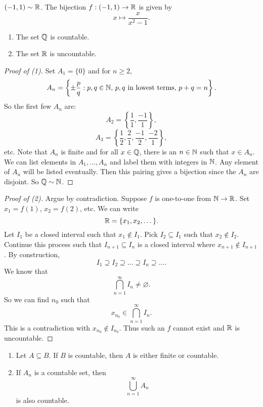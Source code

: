 \begin{example}
  $(-1, 1) \sim \mathbb{R}$.
  The bijection  $f : (-1, 1) \to \mathbb{R}$ is given by
  \[x \mapsto \frac{x}{x^2 - 1}.\]
\end{example}

\begin{theorem}\leavevmode
  \begin{enumerate}
    \item The set $\mathbb{Q}$ is countable.
    \item The set $\mathbb{R}$ is uncountable.
  \end{enumerate}
\end{theorem}

\begin{proof}[Proof of (1)]
  Set $A_1 = \{0\}$ and for $n \ge 2$,
  \[A_n = \left\{\pm \frac{p}{q} : p, q \in \mathbb{N},\, \text{$p, q$ in lowest terms},\, p + q = n\right\}.\]
  So the first few $A_n$ are:
  \[A_2 = \left\{\frac{1}{1}, \frac{-1}{1}\right\},\]
  \[A_3 = \left\{\frac{1}{2}, \frac{2}{1}, \frac{-1}{2}, \frac{-2}{1}\right\},\]
  etc. Note that $A_n$ is finite and
  for all
  $x \in \mathbb{Q}$, there is an $n \in \mathbb{N}$ such that
  $x \in A_n$.
  We can list elements in $A_1, \dots, A_n$ and label
  them with
  integers in $\mathbb{N}$. Any element of $A_n$ will be
  listed eventually. Then this pairing gives
  a bijection since the $A_n$ are disjoint.
  So $\mathbb{Q} \sim \mathbb{N}$.
\end{proof}

\begin{proof}[Proof of (2)]
  Argue by contradiction. Suppose $f$ is one-to-one from
  $\mathbb{N} \to \mathbb{R}$.
  Set $x_1 = f(1)$, $x_2 = f(2)$, etc. We can write
  \[\mathbb{R} = \{x_1, x_2, \dots\}.\]
  Let $I_1$ be a closed interval such that
  $x_1 \notin I_1$. Pick $I_2 \subseteq I_1$ such that
  $x_2 \notin I_2$. Continue this process such that
  $I_{n+1} \subseteq I_n$ is a closed interval where
  $x_{n+1} \notin I_{n+1}$.
  By construction,
  \[I_1 \supseteq I_2 \supseteq \dots \supseteq I_n \supseteq \dots.\]
  We know that
  \[\bigcap_{n = 1}^\infty I_n \ne \varnothing.\]
  So we can find $n_0$ such that
  \[x_{n_0} \in \bigcap_{n = 1}^\infty I_n.\]
  This is a contradiction with $x_{n_0} \notin I_{n_0}$.
  Thus such an $f$ cannot exist and $\mathbb{R}$ is
  uncountable.
\end{proof}

\begin{theorem}\leavevmode
  \begin{enumerate}
    \item Let $A \subseteq B$. If $B$ is countable, then
      $A$ is either finite or countable.
    \item If $A_n$ is a countable set, then
      \[\bigcup_{n=1}^\infty A_n\]
      is also countable.
  \end{enumerate}
\end{theorem}

